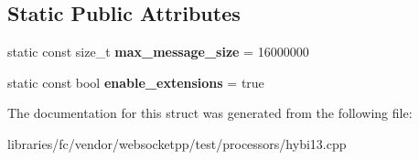 \subsection*{Static Public Attributes}
\begin{DoxyCompactItemize}
\item 
\mbox{\label{structstub__config__ext_abd69405667bf978b87f3345c442b87ff}} 
static const size\+\_\+t {\bfseries max\+\_\+message\+\_\+size} = 16000000
\item 
\mbox{\label{structstub__config__ext_ac0289e7c8826c2e74dcd33bda97dbf87}} 
static const bool {\bfseries enable\+\_\+extensions} = true
\end{DoxyCompactItemize}


The documentation for this struct was generated from the following file\+:\begin{DoxyCompactItemize}
\item 
libraries/fc/vendor/websocketpp/test/processors/hybi13.\+cpp\end{DoxyCompactItemize}
